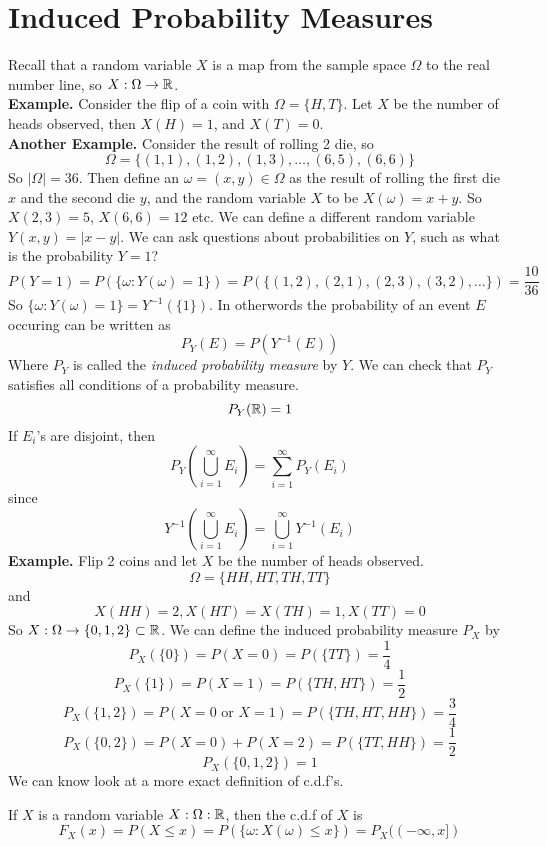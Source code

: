 \documentclass[openany]{report}
\begin{document}
\section{Induced Probability Measures}
Recall that a random variable $X$ is a map from the sample space $\Omega$ to the real number line, so $X: \Omega \rightarrow \mathbb{R}$.\\[2ex]
\textbf{Example.} Consider the flip of a coin with $\Omega = \{H,T\}$. Let $X$ be the number of heads observed, then $X(H) = 1$, and $X(T) = 0$.\\[2ex]
\textbf{Another Example.} Consider the result of rolling 2 die, so 
\[\Omega = \{(1,1), (1,2), (1,3), \ldots, (6,5), (6,6)\}\] 
So $|\Omega| = 36$. Then define an $\omega = (x,y) \in \Omega$ as the result of rolling the first die $x$ and the second die $y$, and the random variable $X$ to be $X(\omega) = x + y$. So $X(2,3) = 5$, $X(6,6) = 12$ etc. We can define a different random variable $Y(x,y) = |x-y|$. We can ask questions about probabilities on $Y$, such as what is the probability $Y = 1$? 
\[P(Y = 1) = P(\{\omega: Y(\omega) = 1\}) = P(\{(1,2),(2,1),(2,3),(3,2), \ldots\}) = \frac{10}{36}\]
So $\{\omega: Y(\omega) = 1\} = Y^{-1}(\{1\})$. In otherwords the probability of an event $E$ occuring can be written as 
\[P_Y(E) = P(Y^{-1}(E))\]  
Where $P_Y$ is called the \emph{induced probability measure} by $Y$. We can check that $P_Y$ satisfies all conditions of a probability measure.
\[P_Y(\mathbb{R}) = 1\]
If $E_i$'s are disjoint, then
\[P_Y\left(\bigcup_{i=1}^\infty E_i\right) = \sum_{i=1}^\infty P_Y(E_i)\]
since 
\[Y^{-1}\left(\bigcup_{i=1}^\infty E_i\right) = \bigcup_{i=1}^\infty Y^{-1}(E_i)\]
\noindent
\textbf{Example.} Flip 2 coins and let $X$ be the number of heads observed. 
\[\Omega = \{HH, HT, TH, TT\}\]
and 
\[X(HH) = 2, X(HT) = X(TH) = 1, X(TT) = 0\]
So $X: \Omega \rightarrow \{0,1,2\} \subset \mathbb{R}$. We can define the induced probability measure $P_X$ by
\[P_X(\{0\}) = P(X=0) = P(\{TT\}) = \frac{1}{4}\]
\[P_X(\{1\}) = P(X=1) = P(\{TH, HT\}) = \frac{1}{2}\]
\[P_X(\{1,2\}) = P(X=0 \text{ or } X = 1) = P(\{TH, HT, HH\}) = \frac{3}{4}\]
\[P_X(\{0,2\}) = P(X=0) + P(X = 2) = P(\{TT, HH\}) = \frac{1}{2}\]
\[P_X(\{0,1,2\}) = 1\]
We can know look at a more exact definition of c.d.f's. 
\begin{definition}
    If $X$ is a random variable $X: \Omega: \mathbb{R}$, then the c.d.f of $X$ is
    \[F_X(x) = P(X \leq x) = P(\{\omega: X(\omega) \leq x\}) = P_X((-\infty, x])\] 
\end{definition}
\end{document}
